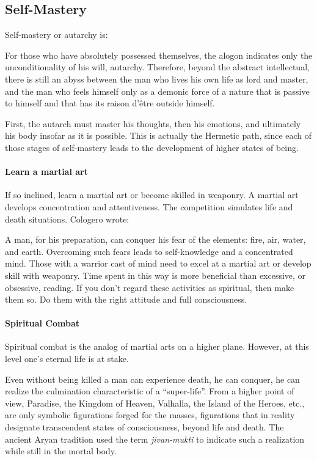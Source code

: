 \subsection{Self-Mastery}
Self-mastery or autarchy is:

\begin{quotex}
For those who have absolutely possessed themselves, the alogon indicates only the unconditionality of his will, autarchy. Therefore, beyond the abstract intellectual, there is still an abyss between the man who lives his own life as lord and master, and the man who feels himself only as a demonic force of a nature that is passive to himself and that has its raison d'être outside himself. 

\end{quotex}
First, the autarch must master his thoughts, then his emotions, and ultimately his body insofar as it is possible. This is actually the Hermetic path, since each of those stages of self-mastery leads to the development of higher states of being.

\paragraph{Learn a martial art}
If so inclined, learn a martial art or become skilled in weaponry. A martial art develops concentration and attentiveness. The competition simulates life and death situations. Cologero wrote:

\begin{quotex}
A man, for his preparation, can conquer his fear of the elements: fire, air, water, and earth. Overcoming such fears leads to self-knowledge and a concentrated mind. Those with a warrior cast of mind need to excel at a martial art or develop skill with weaponry. Time spent in this way is more beneficial than excessive, or obsessive, reading. If you don't regard these activities as spiritual, then make them so. Do them with the right attitude and full consciousness. 

\end{quotex}
\paragraph{Spiritual Combat}
Spiritual combat is the analog of martial arts on a higher plane. However, at this level one's eternal life is at stake.

\begin{quotex}
Even without being killed a man can experience death, he can conquer, he can realize the culmination characteristic of a “super-life”. From a higher point of view, Paradise, the Kingdom of Heaven, Valhalla, the Island of the Heroes, etc., are only symbolic figurations forged for the masses, figurations that in reality designate transcendent states of consciousness, beyond life and death. The ancient Aryan tradition used the term \emph{jivan-mukti} to indicate such a realization while still in the mortal body. 

\end{quotex}
